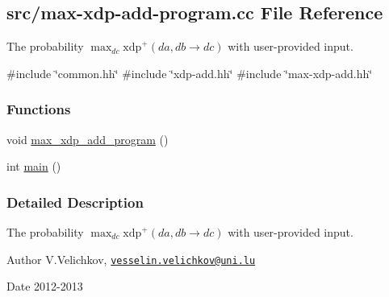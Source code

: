 \hypertarget{max-xdp-add-program_8cc}{\subsection{src/max-\/xdp-\/add-\/program.cc \-File \-Reference}
\label{max-xdp-add-program_8cc}
}


\-The probability $\max_{dc} \mathrm{xdp}^{+}(da, db \rightarrow dc)$ with user-\/provided input.  


{\ttfamily \#include \char`\"{}common.\-hh\char`\"{}}\*
{\ttfamily \#include \char`\"{}xdp-\/add.\-hh\char`\"{}}\*
{\ttfamily \#include \char`\"{}max-\/xdp-\/add.\-hh\char`\"{}}\*
\subsubsection*{\-Functions}
\begin{DoxyCompactItemize}
\item 
void \hyperlink{max-xdp-add-program_8cc_a25cc586250b0ffed6292736c94257c34}{max\-\_\-xdp\-\_\-add\-\_\-program} ()
\item 
int \hyperlink{max-xdp-add-program_8cc_ae66f6b31b5ad750f1fe042a706a4e3d4}{main} ()
\end{DoxyCompactItemize}


\subsubsection{\-Detailed \-Description}
\-The probability $\max_{dc} \mathrm{xdp}^{+}(da, db \rightarrow dc)$ with user-\/provided input. \begin{DoxyAuthor}{\-Author}
\-V.\-Velichkov, \href{mailto:vesselin.velichkov@uni.lu}{\tt vesselin.\-velichkov@uni.\-lu} 
\end{DoxyAuthor}
\begin{DoxyDate}{\-Date}
2012-\/2013 
\end{DoxyDate}



